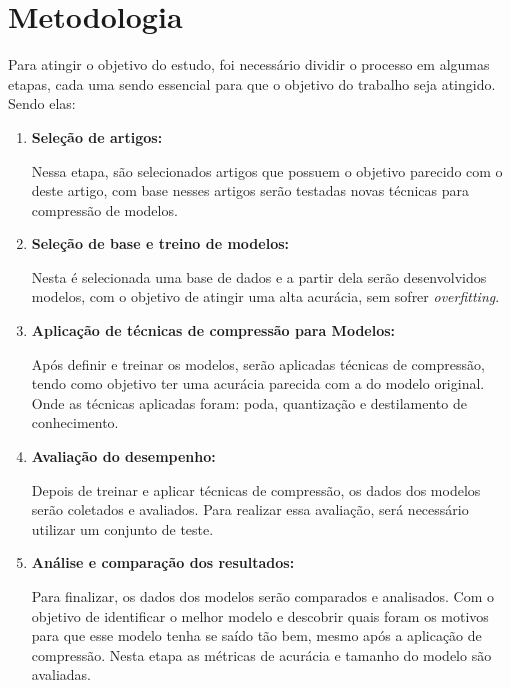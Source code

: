 \section{Metodologia}
Para atingir o objetivo do estudo, foi necessário dividir o processo em algumas etapas, cada uma sendo
essencial para que o objetivo do trabalho seja atingido. Sendo elas:

\begin{enumerate}
	\item \textbf{Seleção de artigos:}

		Nessa etapa, são selecionados artigos que possuem o objetivo parecido com o deste artigo,
		com base nesses artigos serão testadas novas técnicas para compressão de modelos.

	\item \textbf{Seleção de base e treino de modelos:}

		Nesta é selecionada uma base de dados e a partir dela serão desenvolvidos modelos,
		com o objetivo de atingir uma alta acurácia, sem sofrer \textit{overfitting}.

	\item \textbf{Aplicação de técnicas de compressão para Modelos:}

		Após definir e treinar os modelos, serão aplicadas técnicas de compressão, tendo como
		objetivo ter uma acurácia parecida com a do modelo original. Onde as técnicas aplicadas
		foram: poda, quantização e destilamento de conhecimento.

	\item \textbf{Avaliação do desempenho:}

		Depois de treinar e aplicar técnicas de compressão, os dados dos modelos serão coletados e
		avaliados. Para realizar essa avaliação, será necessário utilizar um conjunto de teste.

	\item \textbf{Análise e comparação dos resultados:}

		Para finalizar, os dados dos modelos serão comparados e analisados. Com o objetivo de
		identificar o melhor modelo e descobrir quais foram os motivos para que esse modelo tenha se
		saído tão bem, mesmo após a aplicação de compressão. Nesta etapa as métricas de acurácia e
		tamanho do modelo são avaliadas.

\end{enumerate}

